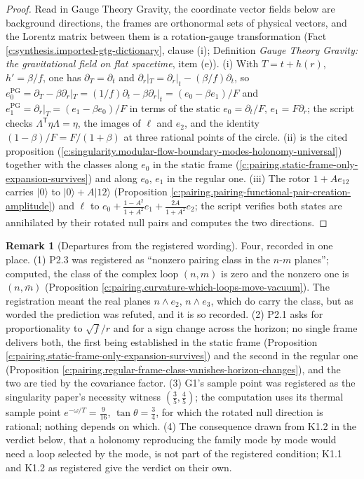 \documentclass[11pt]{article}
\theoremstyle{definition}
\newtheorem{remark}[theorem]{Remark}
\theoremstyle{plain}
\providecommand{\mb}{}\renewcommand{\mb}{\bar m}
\providecommand{\ket}{}\renewcommand{\ket}[1]{|#1\rangle}
\begin{document}
\begin{proof}
Read in Gauge Theory Gravity, the coordinate vector fields below are background directions, the frames are orthonormal sets of physical vectors, and the Lorentz matrix between them is a rotation-gauge transformation (Fact \ref{c:synthesis.imported-gtg-dictionary}, clause (i); Definition \emph{Gauge Theory Gravity: the gravitational field on flat spacetime}, item (e)). (i) With $T = t + h(r)$, $h' = \beta/f$, one has $\partial_{T} = \partial_{t}$ and $\partial_{r}|_{T} = \partial_{r}|_{t} - (\beta/f)\partial_{t}$, so $e_{0}^{\mathrm{PG}} = \partial_{T} - \beta\partial_{r}|_{T} = (1/f)\partial_{t} - \beta\partial_{r}|_{t} = (e_{0} - \beta e_{1})/F$ and $e_{1}^{\mathrm{PG}} = \partial_{r}|_{T} = (e_{1} - \beta e_{0})/F$ in terms of the static $e_{0} = \partial_{t}/F$, $e_{1} = F\partial_{r}$; the script checks $\Lambda^{\mathsf T}\eta\Lambda = \eta$, the images of $\ell$ and $e_{2}$, and the identity $(1 - \beta)/F = F/(1 + \beta)$ at three rational points of the circle. (ii) is the cited proposition (\ref{c:singularity.modular-flow-boundary-modes-holonomy-universal}) together with the classes along $e_{0}$ in the static frame (\ref{c:pairing.static-frame-only-expansion-survives}) and along $e_{0}$, $e_{1}$ in the regular one. (iii) The rotor $1 + Ae_{12}$ carries $\ket{0}$ to $\ket{0} + A\ket{12}$ (Proposition \ref{c:pairing.pairing-functional-pair-creation-amplitude}) and $\ell$ to $e_{0} + \frac{1 - A^{2}}{1 + A^{2}}e_{1} + \frac{2A}{1 + A^{2}}e_{2}$; the script verifies both states are annihilated by their rotated null pairs and computes the two directions.

\end{proof}

\begin{remark}[Departures from the registered wording]\label{c:note.pairing.departures-registered-wording}
Four, recorded in one place. (1) P2.3 was registered as ``nonzero pairing class in the $n$-$m$ planes''; computed, the class of the complex loop $(n, m)$ is zero and the nonzero one is $(n, \mb)$ (Proposition \ref{c:pairing.curvature-which-loops-move-vacuum}). The registration meant the real planes $n \wedge e_{2}$, $n \wedge e_{3}$, which do carry the class, but as worded the prediction was refuted, and it is so recorded. (2) P2.1 asks for proportionality to $\sqrt f/r$ and for a sign change across the horizon; no single frame delivers both, the first being established in the static frame (Proposition \ref{c:pairing.static-frame-only-expansion-survives}) and the second in the regular one (Proposition \ref{c:pairing.regular-frame-class-vanishes-horizon-changes}), and the two are tied by the covariance factor. (3) G1's sample point was registered as the singularity paper's necessity witness $(\tfrac35, \tfrac45)$; the computation uses its thermal sample point $e^{-\omega/T} = \tfrac{9}{16}$, $\tan\theta = \tfrac34$, for which the rotated null direction is rational; nothing depends on which. (4) The consequence drawn from K1.2 in the verdict below, that a holonomy reproducing the family mode by mode would need a loop selected by the mode, is not part of the registered condition; K1.1 and K1.2 as registered give the verdict on their own.
\end{remark}
\end{document}
